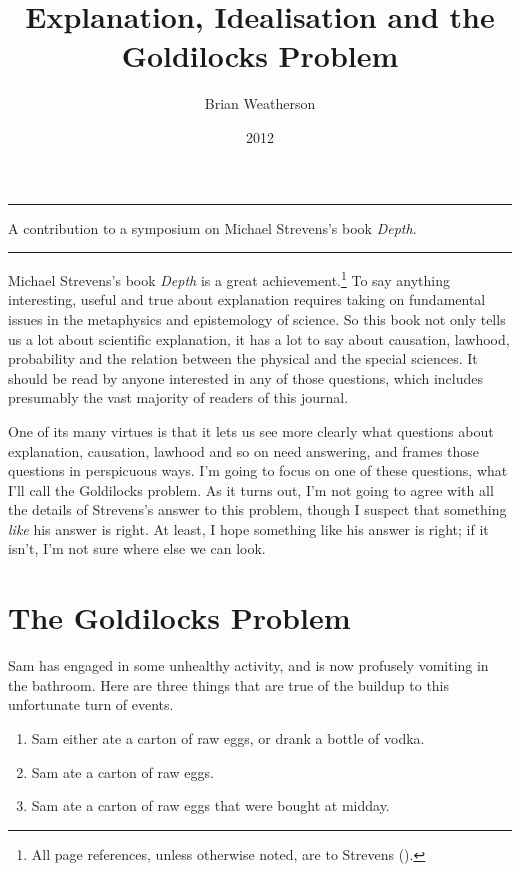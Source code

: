 \documentclass[
  10pt,
  letterpaper,
  DIV=11,
  numbers=noendperiod,
  twoside]{scrartcl}
\title{Explanation, Idealisation and the Goldilocks Problem}
\author{Brian Weatherson}
\date{2012}
\providecommand{\tightlist}{%
  \setlength{\itemsep}{0pt}\setlength{\parskip}{0pt}}\usepackage{longtable,booktabs,array}
\renewenvironment{abstract}
 {\vspace{-1.25cm}
 \quotation\small\noindent\rule{\linewidth}{.5pt}\par\smallskip
 \noindent }
 {\par\noindent\rule{\linewidth}{.5pt}\endquotation}
\begin{document}
\maketitle
\begin{abstract}
A contribution to a symposium on Michael Strevens's book \emph{Depth}.
\end{abstract}

Michael Strevens's book \emph{Depth} is a great achievement.\footnote{All
  page references, unless otherwise noted, are to Strevens
  ().} To say anything interesting,
useful and true about explanation requires taking on fundamental issues
in the metaphysics and epistemology of science. So this book not only
tells us a lot about scientific explanation, it has a lot to say about
causation, lawhood, probability and the relation between the physical
and the special sciences. It should be read by anyone interested in any
of those questions, which includes presumably the vast majority of
readers of this journal.

One of its many virtues is that it lets us see more clearly what
questions about explanation, causation, lawhood and so on need
answering, and frames those questions in perspicuous ways. I'm going to
focus on one of these questions, what I'll call the Goldilocks problem.
As it turns out, I'm not going to agree with all the details of
Strevens's answer to this problem, though I suspect that something
\emph{like} his answer is right. At least, I hope something like his
answer is right; if it isn't, I'm not sure where else we can look.

\section{The Goldilocks Problem}\label{the-goldilocks-problem}

Sam has engaged in some unhealthy activity, and is now profusely
vomiting in the bathroom. Here are three things that are true of the
buildup to this unfortunate turn of events.

\begin{enumerate}
\def\labelenumi{\arabic{enumi}.}
\tightlist
\item
  Sam either ate a carton of raw eggs, or drank a bottle of vodka.
\item
  Sam ate a carton of raw eggs.
\item
  Sam ate a carton of raw eggs that were bought at midday.
\end{enumerate}
\end{document}
